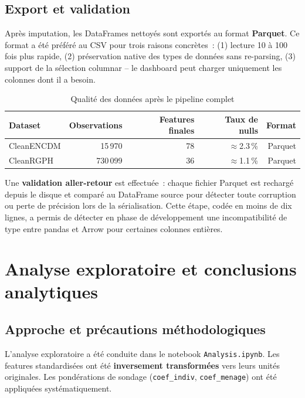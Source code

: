 \documentclass[12pt,a4paper]{report}
\begin{document}
\section{Export et validation}

Après imputation, les DataFrames nettoyés sont exportés au format \textbf{Parquet}. Ce format a été préféré au CSV pour trois raisons concrètes~: (1) lecture 10 à 100 fois plus rapide, (2) préservation native des types de données sans re-parsing, (3) support de la sélection columnar -- le dashboard peut charger uniquement les colonnes dont il a besoin.

\begin{table}[H]
\centering
\caption{Qualité des données après le pipeline complet}
\label{tab:data_quality}
\begin{tabular}{lrrrr}
\toprule
\textbf{Dataset} & \textbf{Observations} & \textbf{Features finales} & \textbf{Taux de nulls} & \textbf{Format} \\
\midrule
CleanENCDM & 15\,970 & 78 & $\approx$2.3\,\% & Parquet \\
CleanRGPH  & 730\,099 & 36 & $\approx$1.1\,\% & Parquet \\
\bottomrule
\end{tabular}
\end{table}

Une \textbf{validation aller-retour} est effectuée~: chaque fichier Parquet est rechargé depuis le disque et comparé au DataFrame source pour détecter toute corruption ou perte de précision lors de la sérialisation. Cette étape, codée en moins de dix lignes, a permis de détecter en phase de développement une incompatibilité de type entre pandas et Arrow pour certaines colonnes entières.

\chapter{Analyse exploratoire et conclusions analytiques}

\section{Approche et précautions méthodologiques}

L'analyse exploratoire a été conduite dans le notebook \texttt{Analysis.ipynb}. Les features standardisées ont été \textbf{inversement transformées} vers leurs unités originales. Les pondérations de sondage (\texttt{coef\_indiv}, \texttt{coef\_menage}) ont été appliquées systématiquement.
\end{document}
